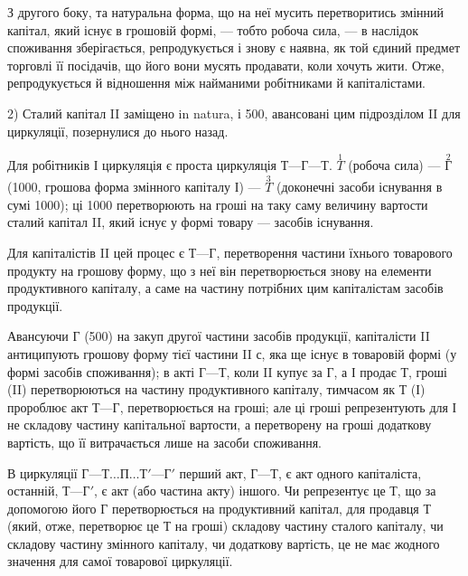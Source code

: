 
З другого боку, та натуральна форма, що на неї мусить перетворитись
змінний капітал, який існує в грошовій формі, — тобто робоча сила, —
в наслідок споживання зберігається, репродукується і знову є наявна,
як той єдиний предмет торговлі її посідачів, що його вони мусять продавати,
коли хочуть жити. Отже, репродукується й відношення між найманими
робітниками й капіталістами.

2) Сталий капітал II заміщено in natura, і 500, авансовані
цим підрозділом II для циркуляції, позернулися до нього назад.

Для робітників І циркуляція є проста циркуляція $Т — Г — Т$. $\overset{1}{T}$ (робоча
сила) — $\overset{2}{Г}$ (1000, грошова форма змінного капіталу І) — $\overset{3}{T}$
(доконечні засоби існування в сумі 1000); ці 1000
перетворюють на гроші на таку саму величину вартости сталий капітал II,
який існує у формі товару — засобів існування.

Для капіталістів II цей процес є $Т — Г$, перетворення частини їхнього
товарового продукту на грошову форму, що з неї він перетворюється
знову на елементи продуктивного капіталу, а саме на частину потрібних
цим капіталістам засобів продукції.

Авансуючи $Г$ (500) на закуп другої частини засобів продукції,
капіталісти II антиципують грошову форму тієї частини II $с$, яка
ще існує в товаровій формі (у формі засобів споживання); в акті $Г — Т$,
коли II купує за $Г$, а І продає $Т$, гроші (II) перетворюються на частину
продуктивного капіталу, тимчасом як $Т$ (І) пророблює акт $Т — Г$, перетворюється
на гроші; але ці гроші репрезентують для І не складову частину
капітальної вартости, а перетворену на гроші додаткову вартість, що її
витрачається лише на засоби споживання.

В циркуляції $Г — Т\dots{} П\dots{} Т' — Г'$ перший акт, $Г — Т$, є акт одного капіталіста,
останній, $Т — Г'$, є акт (або частина акту) іншого. Чи репрезентує
це $Т$, що за допомогою його $Г$ перетворюється на продуктивний капітал,
для продавця $Т$ (який, отже, перетворює це $Т$ на гроші) складову частину
сталого капіталу, чи складову частину змінного капіталу, чи додаткову
вартість, це не має жодного значення для самої товарової циркуляції.

